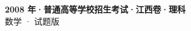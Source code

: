\documentclass[zihao=-4, a4paper]{ctexart}
\begin{document}
\begin{center}
  {\Large\bfseries 2008 年·普通高等学校招生考试·江西卷·理科}\\[4pt]
  {\large 数学 · 试题版}
\end{center}
\medskip
{}

\end{document}
